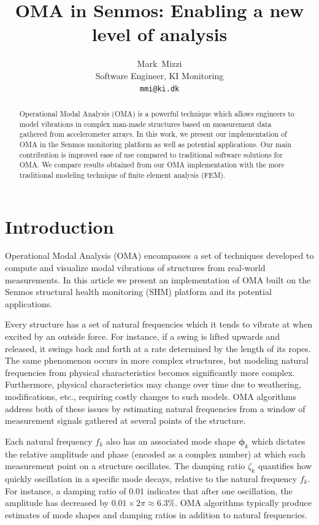 \documentclass[journal,a4paper]{IEEEtran}
\title{OMA in Senmos: Enabling a new level of analysis}
\author{Mark~Mizzi\\
Software Engineer, KI Monitoring\\
\texttt{mmi@ki.dk}}
\begin{document}
\maketitle

\begin{abstract}
    Operational Modal Analysis (OMA) is a powerful technique which allows engineers to model vibrations in complex man-made structures based on measurement data gathered from accelerometer arrays. In this work, we present our implementation of OMA in the Senmos monitoring platform as well as potential applications. Our main contribution is improved ease of use compared to traditional software solutions for OMA. We compare results obtained from our OMA implementation with the more traditional modeling technique of finite element analysis (FEM).
\end{abstract}

\section{Introduction}

Operational Modal Analysis (OMA) encompasses a set of techniques developed to compute and visualize modal vibrations of structures from real-world measurements. In this article we present an implementation of OMA built on the Senmos structural health monitoring (SHM) platform and its potential applications. 

Every structure has a set of natural frequencies which it tends to vibrate at when excited by an outside force. For instance, if a swing is lifted upwards and released, it swings back and forth at a rate determined by the length of its ropes. The same phenomenon occurs in more complex structures, but modeling natural frequencies from physical characteristics becomes significantly more complex. Furthermore, physical characteristics may change over time due to weathering, modifications, etc., requiring costly changes to such models. OMA algorithms address both of these issues by estimating natural frequencies from a window of measurement signals gathered at several points of the structure.

Each natural frequency $f_k$ also has an associated mode shape $\bm{\phi}_k$ which dictates the relative amplitude and phase (encoded as a complex number) at which each measurement point on a structure oscillates. The damping ratio $\zeta_k$ quantifies how quickly oscillation in a specific mode decays, relative to the natural frequency $f_k$. For instance, a damping ratio of $0.01$ indicates that after one oscillation, the amplitude has decreased by $0.01 \times 2\pi \approx 6.3\%$. OMA algorithms typically produce estimates of mode shapes and damping ratios in addition to natural frequencies.
\end{document}
